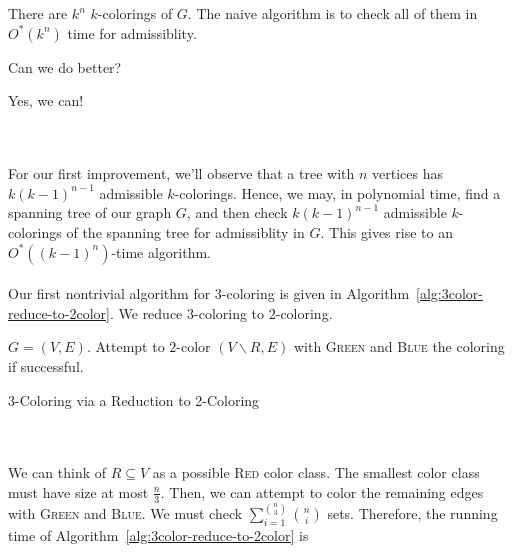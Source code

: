         \\
        \\
        There are \(k^n\) \(k\)-colorings of \(G\). The naive algorithm is to check all of them in \(O^*(k^n)\) time for admissiblity.
        \begin{question*}
            Can we do better?
        \end{question*}
        \begin{answer*}
            Yes, we can!
        \end{answer*}
        \vphantom
        \\
        \\
        For our first improvement, we'll observe that a tree with \(n\) vertices has \(k(k-1)^{n-1}\) admissible \(k\)-colorings. Hence, we may, in polynomial time, find a spanning tree of our graph \(G\), and then check \(k(k-1)^{n-1}\) admissible \(k\)-colorings of the spanning tree for admissiblity in \(G\). This gives rise to an \(O^*((k-1)^n)\)-time algorithm. 
        \\
        \\
        Our first nontrivial algorithm for \(3\)-coloring is given in Algorithm~\ref{alg:3color-reduce-to-2color}. We reduce \(3\)-coloring to \(2\)-coloring.
        \begin{algorithm}[H] 
            \begin{algorithmic}[1]
                \Require \(G=(V,E)\).
                        \State Attempt to \(2\)-color \((V\backslash R,E)\) with \textsc{Green} and \textsc{Blue}
                        \State \Return the coloring if successful.
                    \EndFor
                \EndProcedure 
            \end{algorithmic}
            \caption{3-Coloring via a Reduction to 2-Coloring}
            \label{alg:3color-reduce-to-2color}
        \end{algorithm}
        \vphantom
        \\
        \\
        We can think of \(R\subseteq V\) as a possible \textsc{Red} color class. The smallest color class must have size at most \(\frac{n}{3}\). Then, we can attempt to color the remaining edges with \textsc{Green} and \textsc{Blue}. We must check \(\sum_{i=1}^{\binom{n}{3}} \binom{n}{i}\) sets. Therefore, the running time of Algorithm~\ref{alg:3color-reduce-to-2color} is 

